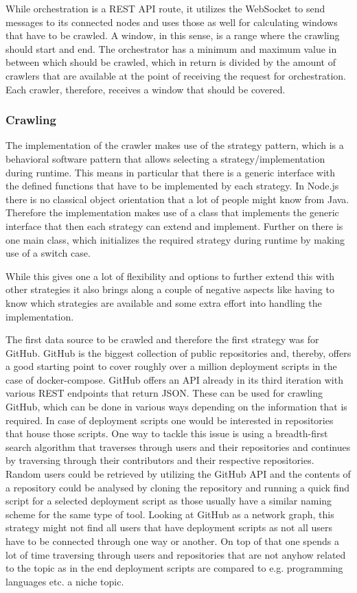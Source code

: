 While orchestration is a REST API route, it utilizes the WebSocket to send messages to its connected nodes and uses those as well for calculating windows that have to be crawled. A window, in this sense, is a range where the crawling should start and end. The orchestrator has a minimum and maximum value in between which should be crawled, which in return is divided by the amount of crawlers that are available at the point of receiving the request for orchestration. Each crawler, therefore, receives a window that should be covered.

\subsubsection{Crawling}
\label{sec:crawling}
The implementation of the crawler makes use of the strategy pattern, which is a behavioral software pattern that allows selecting a strategy/implementation during runtime. This means in particular that there is a generic interface with the defined functions that have to be implemented by each strategy. In Node.js there is no classical object orientation that a lot of people might know from Java. Therefore the implementation makes use of a class that implements the generic interface that then each strategy can extend and implement. Further on there is one main class, which initializes the required strategy during runtime by making use of a switch case.

While this gives one a lot of flexibility and options to further extend this with other strategies it also brings along a couple of negative aspects like having to know which strategies are available and some extra effort into handling the implementation.

The first data source to be crawled and therefore the first strategy was for GitHub. GitHub is the biggest collection of public repositories and, thereby, offers a good starting point to cover roughly over a million deployment scripts in the case of docker-compose.
GitHub offers an API already in its third iteration with various REST endpoints that return JSON. These can be used for crawling GitHub, which can be done in various ways depending on the information that is required. In case of deployment scripts one would be interested in repositories that house those scripts.
One way to tackle this issue is using a breadth-first search algorithm that traverses through users and their repositories and continues by traversing through their contributors and their respective repositories. Random users could be retrieved by utilizing the GitHub API and the contents of a repository could be analysed by cloning the repository and running a quick find script for a selected deployment script as those usually have a similar naming scheme for the same type of tool. Looking at GitHub as a network graph, this strategy might not find all users that have deployment scripts as not all users have to be connected through one way or another. On top of that one spends a lot of time traversing through users and repositories that are not anyhow related to the topic as in the end deployment scripts are compared to e.g. programming languages etc. a niche topic.

